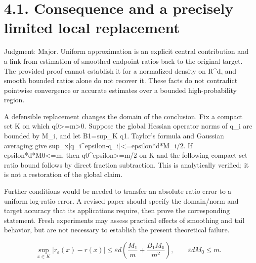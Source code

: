 \documentclass[10pt]{article}
\begin{document}
\section*{4.1. Consequence and a precisely limited local replacement}
Judgment: Major. Uniform approximation is an explicit central contribution and a link from estimation of smoothed endpoint ratios back to the original target. The provided proof cannot establish it for a normalized density on R\textasciicircum{}d, and smooth bounded ratios alone do not recover it. These facts do not contradict pointwise convergence or accurate estimates over a bounded high-probability region.\par
A defensible replacement changes the domain of the conclusion. Fix a compact set K on which q0>=m>0. Suppose the global Hessian operator norms of q\_i are bounded by M\_i, and let B1=sup\_K q1. Taylor’s formula and Gaussian averaging give sup\_x|q\_i\textasciicircum{}epsilon-q\_i|<=epsilon*d*M\_i/2. If epsilon*d*M0<=m, then q0\textasciicircum{}epsilon>=m/2 on K and the following compact-set ratio bound follows by direct fraction subtraction. This is analytically verified; it is not a restoration of the global claim.\par
Further conditions would be needed to transfer an absolute ratio error to a uniform log-ratio error. A revised paper should specify the domain/norm and target accuracy that its applications require, then prove the corresponding statement. Fresh experiments may assess practical effects of smoothing and tail behavior, but are not necessary to establish the present theoretical failure.\par
\[\sup_{x\in K}|r_\varepsilon(x)-r(x)|\leq\varepsilon d\left(\frac{M_1}{m}+\frac{B_1M_0}{m^2}\right),\qquad\varepsilon dM_0\leq m.\]\par
\end{document}
